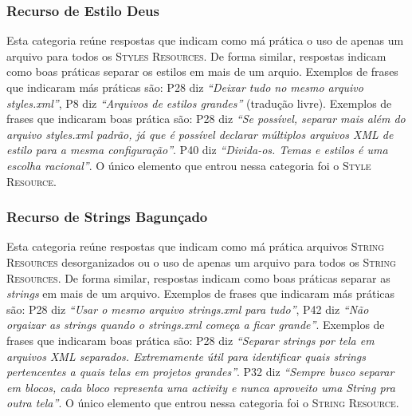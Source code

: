 

\subsubsection{Recurso de Estilo Deus}
Esta categoria re\'une respostas que indicam como m\'a pr\'atica o uso de apenas um arquivo para todos os \textsc{Styles Resources}. De forma similar, respostas indicam como boas pr\'aticas separar os estilos em mais de um arquio. Exemplos de frases que indicaram m\'as pr\'aticas s\~ao: P28 diz \textit{``Deixar tudo no mesmo arquivo styles.xml''}, P8 diz \textit{``Arquivos de estilos grandes''} (tradução livre). Exemplos de frases que indicaram boas pr\'atica s\~ao: P28 diz \textit{``Se possível, separar mais além do arquivo styles.xml padrão, já que é possível declarar múltiplos arquivos XML de estilo para a mesma configuração''}. P40 diz \textit{``Divida-os. Temas e estilos é uma escolha racional''}. O único elemento que entrou nessa categoria foi o \textsc{Style Resource}. 

\subsubsection{Recurso de Strings Bagun\c{c}ado}
Esta categoria re\'une respostas que indicam como m\'a pr\'atica arquivos \textsc{String Resources} desorganizados ou o uso de apenas um arquivo para todos os \textsc{String Resources}. De forma similar, respostas indicam como boas pr\'aticas separar as \textit{strings} em mais de um arquivo. Exemplos de frases que indicaram m\'as pr\'aticas s\~ao: P28 diz \textit{``Usar o mesmo arquivo strings.xml para tudo''}, P42 diz \textit{``Não orgaizar as strings quando o strings.xml começa a ficar grande''}. Exemplos de frases que indicaram boas pr\'atica s\~ao: P28 diz \textit{``Separar strings por tela em arquivos XML separados. Extremamente útil para identificar quais strings pertencentes a quais telas em projetos grandes''}. P32 diz \textit{``Sempre busco separar em blocos, cada bloco representa uma activity e nunca aproveito uma String pra outra tela''}. O único elemento que entrou nessa categoria foi o \textsc{String Resource}. 

